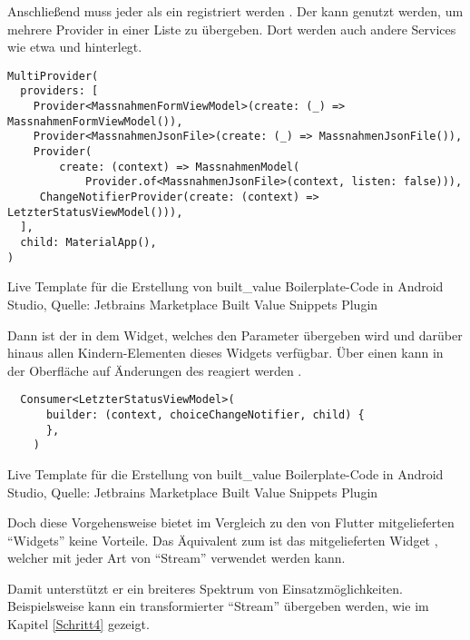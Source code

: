 Anschließend muss jeder  als ein  registriert werden . 
Der  kann genutzt werden, um mehrere Provider in einer Liste zu übergeben.
Dort werden auch andere Services wie etwa   und   hinterlegt.

\ifIncludeFigures
  \begin{listing}[h]
    \begin{verbatim}
MultiProvider(
  providers: [
    Provider<MassnahmenFormViewModel>(create: (_) => MassnahmenFormViewModel()),
    Provider<MassnahmenJsonFile>(create: (_) => MassnahmenJsonFile()),
    Provider(
        create: (context) => MassnahmenModel(
            Provider.of<MassnahmenJsonFile>(context, listen: false))),
     ChangeNotifierProvider(create: (context) => LetzterStatusViewModel())),
  ],
  child: MaterialApp(),
)
\end{verbatim}
    \caption[built_value Live Template]{Live Template für die Erstellung von built_value Boilerplate-Code in Android Studio, Quelle: Jetbrains Marketplace Built Value Snippets Plugin}
    \label{lst:MultiProvider}
  \end{listing}
\fi

Dann ist der  in dem Widget, welches den Parameter  übergeben wird und darüber hinaus allen Kindern-Elementen dieses Widgets verfügbar.
Über einen  kann in der Oberfläche auf Änderungen des  reagiert werden \Lst{\ref{lst:Consumer}}.

\ifIncludeFigures
  \begin{listing}[h]
    \begin{verbatim}
  Consumer<LetzterStatusViewModel>(
      builder: (context, choiceChangeNotifier, child) {
      },
    )
\end{verbatim}
    \caption[built_value Live Template]{Live Template für die Erstellung von built_value Boilerplate-Code in Android Studio, Quelle: Jetbrains Marketplace Built Value Snippets Plugin}
    \label{lst:Consumer}
  \end{listing}
\fi


Doch diese Vorgehensweise bietet im Vergleich zu den von Flutter mitgelieferten \enquote{Widgets} keine Vorteile.
Das Äquivalent zum  ist das mitgelieferten Widget ,
welcher mit jeder Art von \enquote{Stream} verwendet werden kann.

Damit unterstützt er ein breiteres Spektrum von Einsatzmöglichkeiten.
Beispielsweise kann ein transformierter \enquote{Stream} übergeben werden, wie im Kapitel \ref{Schritt4} gezeigt.

